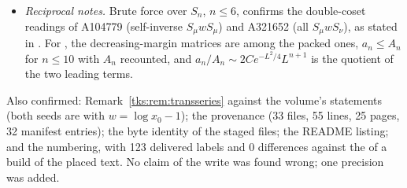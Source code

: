 \begin{writenote}
\begin{itemize}
bracketed note at the end of Appendix~\ref{tks:sec:sectors}.
\item \emph{Reciprocal notes.} Brute force over $S_n$, $n\le6$, confirms the double-coset readings of A104779
(self-inverse $S_\mu wS_\mu$) and A321652 (all $S_\mu wS_\nu$), as stated in .
For , the decreasing-margin matrices are among the packed ones,
$a_n\le A_n$ for $n\le10$ with $A_n$ recounted, and $a_n/A_n\sim2Ce^{-L^2/4}L^{n+1}$ is the quotient of the two
leading terms.
\end{itemize}
Also confirmed: Remark~\ref{tks:rem:transseries} against the volume's statements (both seeds are
 with $w=\log x_0-1$); the provenance (33 files, 55 lines, 25 pages, 32 manifest
entries); the byte identity of the staged files; the README listing; and the numbering, with 123 delivered labels
and 0 differences against the  of a build of the placed text. No claim of the write was found wrong;
one precision was added.
\end{writenote}
